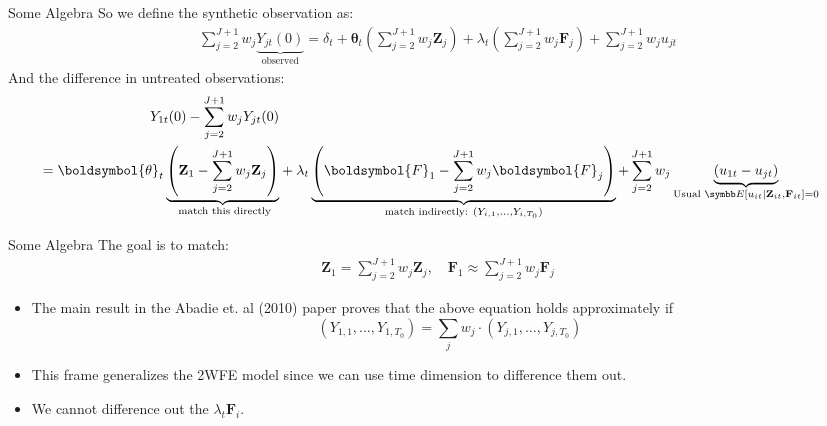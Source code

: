 \documentclass[aspectratio=169,11pt]{beamer}
\begin{document}
\begin{frame}{Some Algebra}
So we define the synthetic observation as:
\begin{align*}
\sum_{j=2}^{J+1} w_{j} \underbrace{Y_{j t}(0)}_{\text{observed}}=\delta_{t}+\boldsymbol{\theta}_{t}\left(\sum_{j=2}^{J+1} w_{j} \mathbf{Z}_{j}\right)+\lambda_{t}\left(\sum_{j=2}^{J+1} w_{j} \boldsymbol{F}_{j}\right)+\sum_{j=2}^{J+1} w_{j} u_{j t}
\end{align*}
And the difference in untreated observations:
\begin{align*}
\begin{aligned}
Y_{1 t}(0)-\sum_{j=2}^{J+1} w_{j} Y_{j t}(0)\\
=\boldsymbol{\theta}_{t} \underbrace{\left( \mathbf{Z}_{1}-\sum_{j=2}^{J+1} w_{j} \mathbf{Z}_{j} \right)}_{\text{ match this directly}} 
&+\lambda_{t} \underbrace{\left(\boldsymbol{F}_{1}-\sum_{j=2}^{J+1} w_{j} \boldsymbol{F}_{j}\right)}_{\text{match indirectly:  }  (Y_{i,1},\ldots,Y_{i,T_0})}+\sum_{j=2}^{J+1} w_{j}\underbrace{\left(u_{1 t}-u_{j t}\right)}_{\text{Usual } \E[u_{it} \mid \mathbf{Z}_{it}, \mathbf{F}_{it} ]=0}
\end{aligned}
\end{align*}
\end{frame}


\begin{frame}{Some Algebra}
The goal is to match:
\begin{align*}
\mathbf{Z}_{1}= \sum_{j=2}^{J+1} w_{j} \mathbf{Z}_{j}, \quad
\mathbf{F}_{1} \approx \sum_{j=2}^{J+1} w_{j} \mathbf{F}_{j} 
\end{align*}
\begin{itemize}
\item The main result in the Abadie et. al (2010) paper proves that the above equation holds approximately if 
$$\left({Y_{1,1},\ldots, Y_{1,T_0}} \right)= \sum_j w_j \cdot \left({Y_{j,1},\ldots, Y_{j,T_0}} \right)$$
\item This frame generalizes the 2WFE model since we can use time dimension to difference them out.
\item We cannot difference out the $\lambda_t \mathbf{F}_i$.
\end{itemize}
\end{frame}
\end{document}

